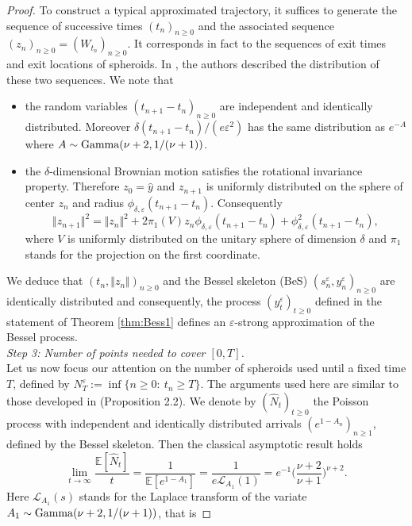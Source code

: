 \documentclass[12pt]{article}
\numberwithin{equation}{section}
\begin{document}
\begin{proof}
To construct a typical approximated trajectory, it suffices to generate the sequence of successive times $(t_n)_{n\ge 0}$ and the associated sequence $(z_n)_{n\ge 0}=(W_{t_n})_{n\ge 0}$. It corresponds in fact to the sequences of exit times and exit locations of spheroids. In \cite{Deaconu-Herrmann-2013}, the authors described the distribution of these two sequences. We note that
\begin{itemize}
\item the random variables $(t_{n+1}-t_n)_{n\ge 0}$ are independent and identically distributed. Moreover $\delta (t_{n+1}-t_n)/(e\varepsilon^2)$ has the same distribution as $e^{-A}$ where $A\sim {\rm Gamma}(\nu+2,1/(\nu+1))$.
\item the $\delta$-dimensional Brownian motion satisfies the rotational invariance property. Therefore $z_0=\hat{y}$ and $z_{n+1}$ is uniformly distributed on the sphere of center $z_n$ and radius $\phi_{\delta,\varepsilon}(t_{n+1}-t_n)$. Consequently 
\[
\Vert z_{n+1}\Vert^2=\Vert z_{n}\Vert^2+2\pi_1(V)z_n\phi_{\delta,\varepsilon}(t_{n+1}-t_n)+\phi_{\delta,\varepsilon}^2(t_{n+1}-t_n),
\]
where $V$ is uniformly distributed on the unitary sphere of dimension $\delta$ and $\pi_1$ stands for the projection on the first coordinate.
\end{itemize}
We deduce that $(t_n,\Vert z_n\Vert)_{n\ge 0}$ and the Bessel skeleton (BeS) $(s_n^\varepsilon,y_n^\varepsilon)_{n\ge 0}$  are identically distributed and consequently, the process $(y^\varepsilon_t)_{t\ge 0}$ defined in the statement of Theorem \ref{thm:Bess1} defines an $\varepsilon$-strong approximation of the Bessel process. \\[5pt]
\noindent\emph{Step 3: Number of points needed to cover $[0,T]$.}\\[5pt]
Let us now focus our attention on the number of spheroids used until a fixed time $T$, defined by $N^\varepsilon_T:=\inf\{n\ge 0:\ t_n\ge T\}$. The arguments used here are similar to those developed in \cite{deaconu2020strong} (Proposition 2.2). We denote by $(\hat{N}_t)_{t\ge 0}$ the Poisson process with independent and identically distributed arrivals $(e^{1-A_n})_{n\ge 1}$, defined by the Bessel skeleton. Then the classical asymptotic result holds
\begin{equation}\label{eq:limithm}
\lim_{t\to\infty}\frac{\mathbb{E}[\hat{N}_t]}{t}=\frac{1}{\mathbb{E}[e^{1-A_1}]}=\frac{1}{e\mathcal{L}_{A_1}(1)}=e^{-1}\Big(\frac{\nu+2}{\nu+1}\Big)^{\nu+2}.
\end{equation}
Here $\mathcal{L}_{A_1}(s)$ stands for the Laplace transform of the variate $A_1\sim {\rm Gamma}(\nu+2,1/(\nu+1))$, that is

\end{proof}
\end{document}
